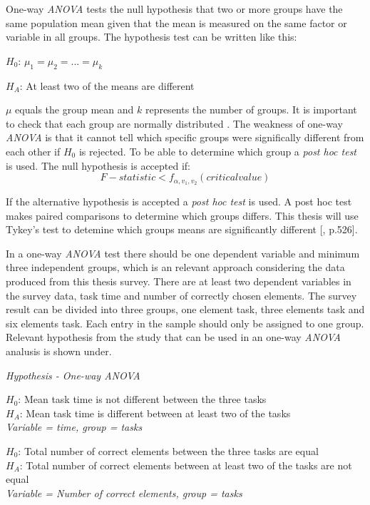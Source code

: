 One-way \textit{ANOVA} tests the null hypothesis that two or more groups have the same population mean given that the mean is measured on the same factor or variable in all groups\citep{LundResearchLtd2013a}. The hypothesis test can be written like this:\newline

\centerline{$H_{0}$:  $\mu_{1} =  \mu_{2} = ... = \mu_{k} $} 
\centerline{$H_{A}$:  At least two of the means are different}

$\mu$ equals the group mean and $k$ represents the number of groups. It is important to check that each group are normally distributed \citep{LundResearchLtd2013a}. The weakness of one-way \textit{ANOVA} is that it cannot tell which specific groups were significally different from each other if $H_{0}$ is rejected. To be able to determine which group a \textit{post hoc test} is used. The null hypothesis is accepted if:\\

\begin{equation}
\label{eq:anova_reject}
F-statistic < f_{\alpha, v_{1}, v_{2}} (critical value)
\end{equation}

If the alternative hypothesis is accepted a \textit{post hoc test} is used. A post hoc test makes paired comparisons to determine which groups differs. This thesis will use Tykey's test to detemine which groups means are significantly different [\citep{Walpole2012}, p.526]. 

In a one-way \textit{ANOVA} test there should be one dependent variable and minimum three independent groups, which is an relevant approach considering the data produced from this thesis survey. There are at least two dependent variables in the survey data, task time and number of correctly chosen elements. The survey result can be divided into three groups, one element task, three elements task and six elements task. Each entry in the sample should only be assigned to one group. Relevant hypothesis from the study that can be used in an one-way \textit{ANOVA} analusis is shown under. \newline

\begin{framed}
		\begin{center}
			\textit{Hypothesis - One-way \textit{ANOVA}} \newline
			
			$H_{0}$: Mean task time is not different between the three tasks\\
			$H_{A}$: Mean task time is different between at least two of the tasks\\
			\textit{Variable = time, group = tasks}\newline
			
			$H_{0}$: Total number of correct elements between the three tasks are equal \\
			$H_{A}$: Total number of correct elements between at least two of the tasks are not equal \\
			\textit{Variable = Number of correct elements, group = tasks}\newline
	\end{center}
\end{framed}

